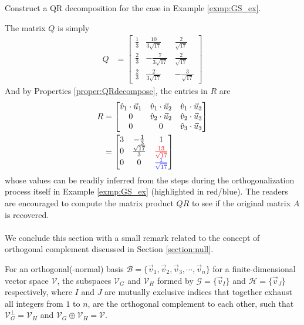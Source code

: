 \begin{exmp}
\label{exmp:QRdecom}
Construct a QR decomposition for the case in Example \ref{exmp:GS_ex}.
\end{exmp}
\begin{solution}
The matrix $Q$ is simply
\begin{align*}
Q &= 
\begin{bmatrix}
\frac{1}{3} & \frac{10}{3\sqrt{17}} & \frac{2}{\sqrt{17}} \\
\frac{2}{3} & -\frac{7}{3\sqrt{17}} & \frac{2}{\sqrt{17}} \\
\frac{2}{3} & \frac{2}{3\sqrt{17}} & -\frac{3}{\sqrt{17}}
\end{bmatrix}
\end{align*}
And by Properties \ref{proper:QRdecompose}, the entries in $R$ are
\begin{align*}
R &= 
\begin{bmatrix}
\hat{v}_1 \cdot \vec{u}_1 &  \hat{v}_1 \cdot \vec{u}_2 & \hat{v}_1 \cdot \vec{u}_3 \\
0 & \hat{v}_2 \cdot \vec{u}_2 &  \hat{v}_2 \cdot \vec{u}_3 \\
0 & 0 & \hat{v}_3 \cdot \vec{u}_3 
\end{bmatrix}  \\
&= 
\begin{bmatrix}
3 & -\frac{1}{3} & 1 \\
0 & \frac{\sqrt{17}}{3} & \textcolor{red}{\frac{13}{\sqrt{17}}}  \\
0 & 0 & \textcolor{blue}{\frac{1}{\sqrt{17}}} \\
\end{bmatrix} 
\end{align*}
whose values can be readily inferred from the steps during the orthogonalization process itself in Example \ref{exmp:GS_ex} (highlighted in red/blue). The readers are encouraged to compute the matrix product $QR$ to see if the original matrix $A$ is recovered.\\
\\
We conclude this section with a small remark related to the concept of orthogonal complement discussed in Section \ref{section:null}.
\begin{proper}
For an orthogonal(-normal) basis $\mathcal{B} = \{\vec{v}_1, \vec{v}_2, \vec{v}_3, \cdots, \vec{v}_n\}$ for a finite-dimensional vector space $\mathcal{V}$, the subspaces $\mathcal{V}_G$ and $\mathcal{V}_H$ formed by $\mathcal{G} = \{\vec{v}_I\}$ and $\mathcal{H} = \{\vec{v}_J\}$ respectively, where $I$ and $J$ are mutually exclusive indices that together exhaust all integers from $1$ to $n$, are the orthogonal complement to each other, such that $\mathcal{V}_G^\perp = \mathcal{V}_H$ and $\mathcal{V}_G \oplus \mathcal{V}_H = \mathcal{V}$.
\end{proper}
\end{solution}

